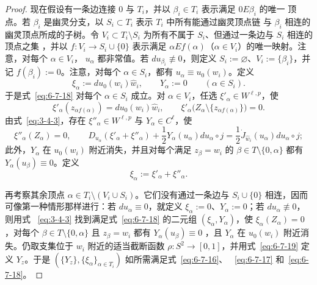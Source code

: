\begin{proof}
现在假设有一条边连接 $0$ 与 $T_i$，并以 $\beta_i\in T_i$ 表示满足 $0E\beta_i$ 的唯一
顶点。若 $\beta_i$ 是幽灵分支，以 $S_i\subset T_i$ 表示 $T_i$ 中所有能通过幽灵顶点链
与 $\beta_i$ 相连的幽灵顶点所成的子树。令 $V_i\subset T_i\setminus S_i$ 为所有不属于
$S_i$、但通过一条边与 $S_i$ 相连的顶点之集
，并以 $f:V_i\to S_i\cup\{0\}$ 表示满足
$\alpha E f(\alpha)$（$\alpha\in V_i$）的唯一映射。注意，对每个 $\alpha\in V_i$，
$u_\alpha$ 都非常值。若 $du_{\beta_i}\not\equiv0$，则定义
$S_i:=\varnothing$、$V_i:=\{\beta_i\}$，并记 $f(\beta_i):=0$。注意，对每个
$\alpha\in S_i$，都有 $u_\alpha\equiv u_0(w_i)$。定义
\[
  \xi_\alpha:=du_0(w_i)\widehat w_i,
  \qquad Y_\alpha:=0
  \qquad(\alpha\in S_i).
\]
于是式~\eqref{eq:6-7-18} 对每个 $\alpha\in S_i$ 成立。对 $\alpha\in V_i$，任选
$\xi'_\alpha\in W^{\ell,p}$，使
\[
  \xi'_\alpha(z_{\alpha f(\alpha)})=du_0(w_i)\widehat w_i,
  \qquad
  \xi'_\alpha\bigl(Z_\alpha\setminus\{z_{\alpha f(\alpha)}\}\bigr)=0.
\]
由式~\eqref{eq:3-4-3}，存在 $\xi''_\alpha\in W^{\ell,p}$ 与
$Y_\alpha\in C^\ell$，使
\[
  \xi''_\alpha(Z_\alpha)=0,
  \qquad
  D_{u_\alpha}(\xi'_\alpha+\xi''_\alpha)
  +\frac12Y_\alpha(u_\alpha)du_\alpha\circ j
  =\frac12\dot J_{\widehat w_i}(u_\alpha)du_\alpha\circ j;
\]
此外，$Y_\alpha$ 在 $u_0(w_i)$ 附近消失，并且对每个满足 $z_\beta=w_i$ 的
$\beta\in T\setminus\{0,\alpha\}$ 都有 $Y_\alpha(u_\beta)\equiv0$。定义
\[
  \xi_\alpha:=\xi'_\alpha+\xi''_\alpha.
\]

再考察其余顶点 $\alpha\in T_i\setminus(V_i\cup S_i)$。它们没有通过一条边与
$S_i\cup\{0\}$ 相连，因而可像第一种情形那样进行：若 $du_\alpha\equiv0$，就定义
$\xi_\alpha:=0$、$Y_\alpha:=0$；若 $du_\alpha\not\equiv0$，则用式
~\eqref{eq:3-4-3} 找到满足式~\eqref{eq:6-7-18} 的二元组
$(\xi_\alpha,Y_\alpha)$，使 $\xi_\alpha(Z_\alpha)=0$，对每个
$\beta\in T\setminus\{0,\alpha\}$ 且 $z_\beta=w_i$ 都有
$Y_\alpha(u_\beta)\equiv0$
，且 $Y_\alpha$ 在
$u_0(w_i)$ 附近消失。仍取支集位于 $w_i$ 附近的适当截断函数
$\rho:S^2\to[0,1]$，并用式~\eqref{eq:6-7-19} 定义 $Y_z$。于是
$(\{Y_z\},\{\xi_\alpha\}_{\alpha\in T_i})$ 如所需满足式~\eqref{eq:6-7-16}、
~\eqref{eq:6-7-17} 和~\eqref{eq:6-7-18}。


\end{proof}

